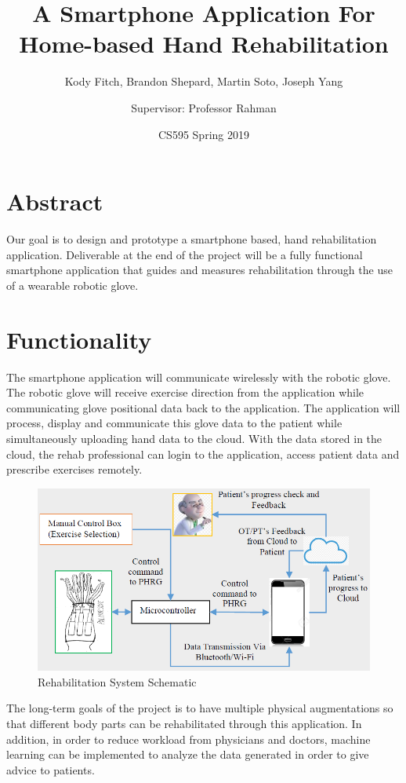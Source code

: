 \documentclass[a4paper,10pt]{article}
\title{\vspace{-10ex}A Smartphone Application For Home-based Hand Rehabilitation}
\author{Kody Fitch, Brandon Shepard, Martin Soto, Joseph Yang\and Supervisor: Professor Rahman}
\date{CS595 Spring 2019}
\begin{document}
\maketitle

\section{Abstract}
    Our goal is to design and prototype a smartphone based, hand rehabilitation application. Deliverable at the end of the project will be a fully functional smartphone application that guides and measures rehabilitation through the use of a wearable robotic glove. 

\section{Functionality}
    The smartphone application will communicate wirelessly with the robotic glove. The robotic glove will receive exercise direction from the application while communicating glove positional data back to the application. The application will process, display and communicate this glove data to the patient while simultaneously uploading hand data to the cloud. With the data stored in the cloud, the rehab professional can login to the application, access patient data and prescribe exercises remotely.
    \begin{figure}[H]
         \centering
         \includegraphics[width=1\textwidth]{rahmanSchematic}
         \caption{Rehabilitation System Schematic}
    \end{figure}
The long-term goals of the project is to have multiple physical augmentations so that different body parts can be rehabilitated through this application. In addition, in order to reduce workload from physicians and doctors, machine learning can be implemented to analyze the data generated in order to give advice to patients.
\end{document}
